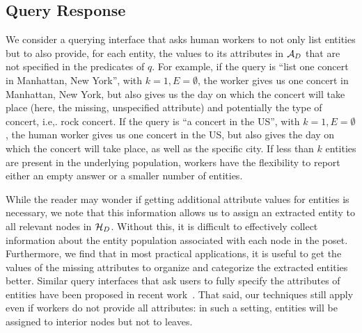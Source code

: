 \subsection{Query Response} 
We consider a querying interface that asks human workers to not only list entities but to also provide, for each entity, the values to its attributes in $\mathcal{A}_D$ that are not specified in the predicates of $q$. For example, if the query is ``list one concert in Manhattan, New York'', with $k = 1, E = \emptyset$, the worker gives us one concert in Manhattan, New York, but also gives us the day on which the concert will take place (here, the missing, unspecified attribute) and potentially the type of concert, i.e,. rock concert. If the query is ``a concert in the US'', with $k = 1, E = \emptyset$, the human worker gives us one concert in the US, but also gives the day on which the concert will take place, as well as the specific city. If less than $k$ entities are present in the underlying population, workers have the flexibility to report either an empty answer or a smaller number of entities.

While the reader may wonder if getting additional attribute values for entities is necessary, we note that this information allows us to assign an extracted entity to all relevant nodes in $\mathcal{H}_D$. Without this, it is difficult to effectively collect information about the entity population associated with each node in the poset. Furthermore, we find that in most practical applications, it is useful to get the values of the missing attributes to organize and categorize the extracted entities better. Similar query interfaces that ask users to fully specify the attributes of entities have been proposed in recent work~\cite{quinn:2014}.  That said, our techniques still apply even if workers do not provide
all attributes: in such a setting, entities will be assigned to interior nodes but not to leaves.

